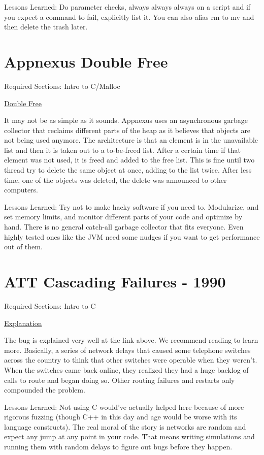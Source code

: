 Lessons Learned: Do parameter checks, always always always  on a script and if you expect a command to fail, explicitly list it. You can also alias rm to mv and then delete the trash later.

\section{Appnexus Double Free}

Required Sections: Intro to C/Malloc

\href{https://techblog.appnexus.com/2013-09-17-outage-postmortem-586b19ae4307}{Double Free}

It may not be as simple as it sounds.
Appnexus uses an asynchronous garbage collector that reclaims different parts of the heap as it believes that objects are not being used anymore.
The architecture is that an element is in the unavailable list and then it is taken out to a to-be-freed list.
After a certain time if that element was not used, it is freed and added to the free list.
This is fine until two thread try to delete the same object at once, adding to the list twice. After less time, one of the objects was deleted, the delete was announced to other computers.

Lessons Learned: Try not to make hacky software if you need to. Modularize, and set memory limits, and monitor different parts of your code and optimize by hand. There is no general catch-all garbage collector that fits everyone. Even highly tested ones like the JVM need some nudges if you want to get performance out of them.

\section{ATT Cascading Failures - 1990}

Required Sections: Intro to C

\href{http://users.csc.calpoly.edu/~jdalbey/SWE/Papers/att_collapse.html}{Explanation}

The bug is explained very well at the link above.
We recommend reading to learn more.
Basically, a series of network delays that caused some telephone switches across the country to think that other switches were operable when they weren't.
When the switches came back online, they realized they had a huge backlog of calls to route and began doing so.
Other routing failures and restarts only compounded the problem.

Lessons Learned: Not using C would've actually helped here because of more rigorous fuzzing (though C++ in this day and age would be worse with its language constructs).
The real moral of the story is networks are random and expect any jump at any point in your code.
That means writing simulations and running them with random delays to figure out bugs before they happen.
